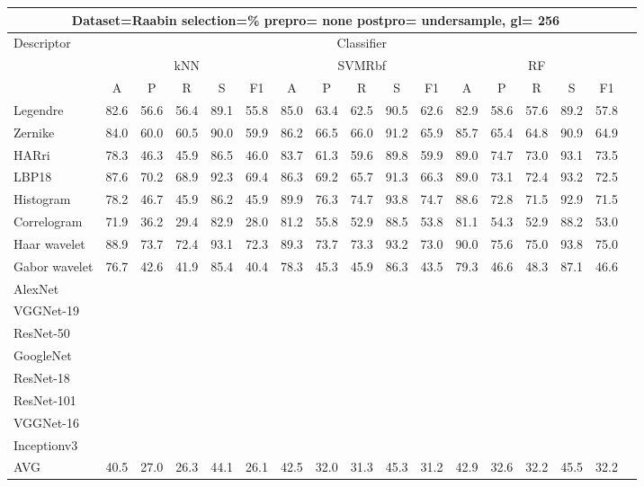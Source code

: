 \documentclass[12pt,italian]{article}
\begin{document}
\begin{tiny}
\begin{longtable}{lcccccccccccccccc}
\toprule
\multicolumn{16}{c}{Dataset=Raabin selection=\% prepro= none postpro= undersample, gl= 256} \\ 
\toprule
Descriptor & \multicolumn{15}{c}{Classifier} \\ 
& \multicolumn{5}{c}{kNN} & \multicolumn{5}{c}{SVMRbf} & \multicolumn{5}{c}{RF} \\ 
& A & P & R & S & F1 & A & P & R & S & F1 & A & P & R & S & F1 \\ 
\midrule
Legendre & 82.6 & 56.6 & 56.4 & 89.1 & 55.8 & 85.0 & 63.4 & 62.5 & 90.5 & 62.6 & 82.9 & 58.6 & 57.6 & 89.2 & 57.8 \\ 
Zernike & 84.0 & 60.0 & 60.5 & 90.0 & 59.9 & 86.2 & 66.5 & 66.0 & 91.2 & 65.9 & 85.7 & 65.4 & 64.8 & 90.9 & 64.9 \\ 
HARri & 78.3 & 46.3 & 45.9 & 86.5 & 46.0 & 83.7 & 61.3 & 59.6 & 89.8 & 59.9 & 89.0 & 74.7 & 73.0 & 93.1 & 73.5 \\ 
LBP18 & 87.6 & 70.2 & 68.9 & 92.3 & 69.4 & 86.3 & 69.2 & 65.7 & 91.3 & 66.3 & 89.0 & 73.1 & 72.4 & 93.2 & 72.5 \\ 
Histogram & 78.2 & 46.7 & 45.9 & 86.2 & 45.9 & 89.9 & 76.3 & 74.7 & 93.8 & 74.7 & 88.6 & 72.8 & 71.5 & 92.9 & 71.5 \\ 
Correlogram & 71.9 & 36.2 & 29.4 & 82.9 & 28.0 & 81.2 & 55.8 & 52.9 & 88.5 & 53.8 & 81.1 & 54.3 & 52.9 & 88.2 & 53.0 \\ 
Haar wavelet & 88.9 & 73.7 & 72.4 & 93.1 & 72.3 & 89.3 & 73.7 & 73.3 & 93.2 & 73.0 & 90.0 & 75.6 & 75.0 & 93.8 & 75.0 \\ 
Gabor wavelet & 76.7 & 42.6 & 41.9 & 85.4 & 40.4 & 78.3 & 45.3 & 45.9 & 86.3 & 43.5 & 79.3 & 46.6 & 48.3 & 87.1 & 46.6 \\ 
AlexNet \\ 
VGGNet-19 \\ 
ResNet-50 \\ 
GoogleNet \\ 
ResNet-18 \\ 
ResNet-101 \\ 
VGGNet-16 \\ 
Inceptionv3 \\ 
\hline
AVG & 40.5 & 27.0 & 26.3 & 44.1 & 26.1 & 42.5 & 32.0 & 31.3 & 45.3 & 31.2 & 42.9 & 32.6 & 32.2 & 45.5 & 32.2 \\ 
\hline
\bottomrule
\end{longtable} 


\end{tiny}
\end{document}
